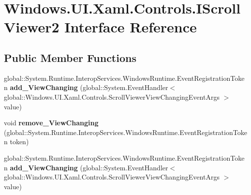 \hypertarget{interface_windows_1_1_u_i_1_1_xaml_1_1_controls_1_1_i_scroll_viewer2}{}\section{Windows.\+U\+I.\+Xaml.\+Controls.\+I\+Scroll\+Viewer2 Interface Reference}
\label{interface_windows_1_1_u_i_1_1_xaml_1_1_controls_1_1_i_scroll_viewer2}
\subsection*{Public Member Functions}
\begin{DoxyCompactItemize}
\item 
\mbox{\label{interface_windows_1_1_u_i_1_1_xaml_1_1_controls_1_1_i_scroll_viewer2_ab9faa4a9ca64c26b97189526048850c2}} 
global\+::\+System.\+Runtime.\+Interop\+Services.\+Windows\+Runtime.\+Event\+Registration\+Token {\bfseries add\+\_\+\+View\+Changing} (global\+::\+System.\+Event\+Handler$<$ global\+::\+Windows.\+U\+I.\+Xaml.\+Controls.\+Scroll\+Viewer\+View\+Changing\+Event\+Args $>$ value)
\item 
\mbox{\label{interface_windows_1_1_u_i_1_1_xaml_1_1_controls_1_1_i_scroll_viewer2_a2b45356f899d6a5457fe98be7fc73d44}} 
void {\bfseries remove\+\_\+\+View\+Changing} (global\+::\+System.\+Runtime.\+Interop\+Services.\+Windows\+Runtime.\+Event\+Registration\+Token token)
\item 
\mbox{\label{interface_windows_1_1_u_i_1_1_xaml_1_1_controls_1_1_i_scroll_viewer2_ab9faa4a9ca64c26b97189526048850c2}} 
global\+::\+System.\+Runtime.\+Interop\+Services.\+Windows\+Runtime.\+Event\+Registration\+Token {\bfseries add\+\_\+\+View\+Changing} (global\+::\+System.\+Event\+Handler$<$ global\+::\+Windows.\+U\+I.\+Xaml.\+Controls.\+Scroll\+Viewer\+View\+Changing\+Event\+Args $>$ value)
\item 
\mbox{\label{interface_windows_1_1_u_i_1_1_xaml_1_1_controls_1_1_i_scroll_viewer2_a2b45356f899d6a5457fe98be7fc73d44}} 

\end{DoxyCompactItemize}
